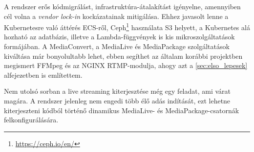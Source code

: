A rendszer erős kódmigrálást, infrastruktúra-átalakítást igényelne, amennyiben cél volna a \emph{vendor lock-in}\cite{lockIn} kockázatainak mitigálása. Ehhez javasolt lenne a Kubernetesre való áttérés ECS-ről\cite{k8s}, Ceph\footnote{\url{https://ceph.io/en/}} használata S3 helyett, a Kubernetes alá hozható az adatbázis, illetve a Lambda-függvények is kis mikroszolgáltatások formájában. A MediaConvert, a MediaLive és MediaPackage szolgáltatások kiváltása már bonyolultabb lehet, ebben segíthet az általam korábbi projektben megismert FFMpeg és az NGINX RTMP-modulja\cite{rtmpNginx}, ahogy azt a \ref{sec:elso_lepesek} alfejezetben is említettem.

Nem utolsó sorban a live streaming kiterjesztése még egy feladat, ami várat magára. A rendszer jelenleg nem engedi több élő adás indítását, ezt lehetne kiterjeszteni kódból történő dinamikus MediaLive- és MediaPackage-csatornák felkonfigurálására.
